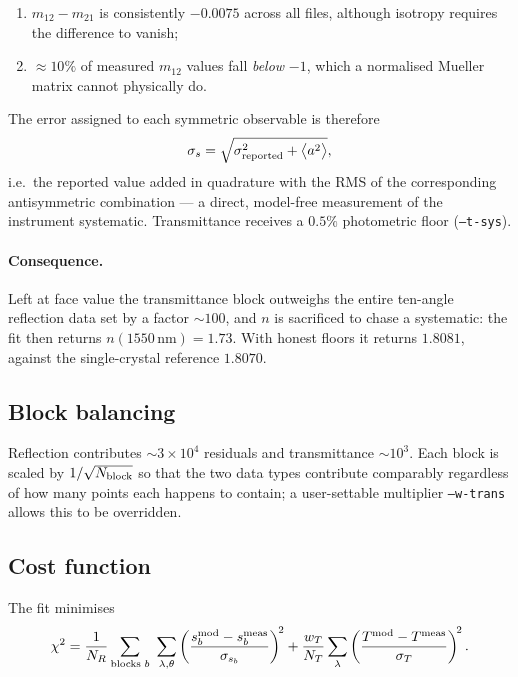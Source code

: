 \documentclass[11pt,a4paper]{article}
\newcommand{\lam}{\lambda}
\begin{document}
\begin{enumerate}
\item $m_{12}-m_{21}$ is consistently $-0.0075$ across all files, although
      isotropy requires the difference to vanish;
\item $\approx10\%$ of measured $m_{12}$ values fall \emph{below} $-1$, which a
      normalised Mueller matrix cannot physically do.
\end{enumerate}

The error assigned to each symmetric observable is therefore
\begin{equation}
\sigma_s=\sqrt{\sigma_{\rm reported}^2+\bigl\langle a^2\bigr\rangle},
\end{equation}
i.e.\ the reported value added in quadrature with the RMS of the corresponding
antisymmetric combination --- a direct, model-free measurement of the instrument
systematic. Transmittance receives a $0.5\%$ photometric floor
(\texttt{--t-sys}).

\paragraph{Consequence.} Left at face value the transmittance block outweighs
the entire ten-angle reflection data set by a factor $\sim100$, and $n$ is
sacrificed to chase a systematic: the fit then returns $n(1550\,\mathrm{nm})
=1.73$. With honest floors it returns $1.8081$, against the single-crystal
reference $1.8070$.

\subsection{Block balancing}

Reflection contributes $\sim3\times10^4$ residuals and transmittance
$\sim10^3$. Each block is scaled by $1/\sqrt{N_{\rm block}}$ so that the two
data types contribute comparably regardless of how many points each happens to
contain; a user-settable multiplier \texttt{--w-trans} allows this to be
overridden.

\subsection{Cost function}

The fit minimises
\begin{equation}
\chi^2=\frac{1}{N_R}\sum_{\text{blocks }b}\ \sum_{\lam,\theta}
\left(\frac{s_b^{\rm mod}-s_b^{\rm meas}}{\sigma_{s_b}}\right)^{\!2}
+\frac{w_T}{N_T}\sum_\lam
\left(\frac{T^{\rm mod}-T^{\rm meas}}{\sigma_T}\right)^{\!2}.
\end{equation}
\end{document}
